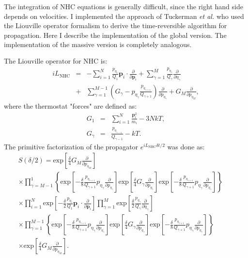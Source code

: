 \documentclass[12pt,a4paper]{article}
\begin{document}
The integration of NHC equations is generally difficult, since the right hand side depends on velocities.
I implemented the approach of Tuckerman \textit{et al.} who used the Liouville operator formalism to derive the time-reversible algorithm for propagation\cite{Martyna1996}. Here I describe the implementation of the global version. The implementation of the massive version is completely analogous.

The Liouville operator for NHC is:
\begin{eqnarray}
iL_{\textrm{NHC}}&=&-\sum^N_{i=1}\frac{p_{\eta_1}}{Q_1}\mathbf{p}_i\cdot \frac{\partial}{\partial \mathbf{p}_i}+
\sum_{\gamma =1}^M\frac{p_{\eta_\gamma}}{Q_\gamma}\frac{\partial}{\partial \eta_\gamma} \\
&+&\sum_{\gamma=1}^{M-1}\left( G_\gamma-p_{\eta_\gamma}\frac{p_{\eta_{\gamma+1}}}{Q_{\gamma+1}}\right)\frac{\partial}{\partial p_{\eta_\gamma}}+G_M\frac{\partial}{\partial p_{\eta_M}} ,\nonumber
\end{eqnarray}
where the thermostat "forces" are defined as:
\begin{eqnarray}
G_1&=&\sum^N_{i=1}\frac{\mathbf{p}_i^2}{m_i}-3NkT   ,\\
G_\gamma &=&\frac{p_{\eta_{\gamma-1}}}{Q_{\gamma-1}}-kT\nonumber  .
\end{eqnarray}
The primitive factorization of the propagator $e^{iL_{\mathrm{NHC}}\delta t/2} $ was done as:
\begin{eqnarray}
S(\delta/2)=\mathrm{exp}\left[\frac{\delta}{4} G_M \frac{\partial}{\partial p_{\eta_M}} \right] &&\nonumber \\
\times \prod^{1}_{\gamma =M-1} \left\lbrace \mathrm{exp}\left[-\frac{\delta}{8}  \frac{p_{\eta_{\gamma+1}}}{Q_{\gamma+1}}
p_{\eta_\gamma}\frac{\partial}{\partial p_{\eta_\gamma}} \right]
\mathrm{exp}\left[\frac{\delta}{4}G_\gamma\frac{\partial}{\partial p_{\eta_\gamma}} \right]
\mathrm{exp}\left[-\frac{\delta}{8}\frac{p_{\eta_{\gamma+1}}}{Q_{\gamma+1}}
p_{\eta_\gamma}\frac{\partial}{\partial p_{\eta_\gamma}} \right] \right\rbrace & & \nonumber\\
\times  \prod^N_{i=1} 
\mathrm{exp}\left[-\frac{\delta}{2}\frac{p_{\eta_1}}{Q_1}\mathbf{p}_i\cdot\frac{\partial}{\partial \mathbf{p}_i} \right]
\prod^M_{\gamma=1} \mathrm{exp}\left[\frac{\delta}{2}\frac{p_{\eta_\gamma}}{Q_\gamma}\frac{\partial}{\partial \eta_\gamma} \right]& &  \nonumber \\
\times  \prod^{M-1}_{\gamma =1} \left\lbrace \mathrm{exp}\left[-\frac{\delta}{8}\frac{p_{\eta_{\gamma+1}}}{Q_{\gamma+1}}
p_{\eta_\gamma}\frac{\partial}{\partial p_{\eta_\gamma}} \right] 
\mathrm{exp}\left[\frac{\delta}{4}G_\gamma\frac{\partial}{\partial p_{\eta_\gamma}} \right]
\mathrm{exp}\left[-\frac{\delta}{8}\frac{p_{\eta_{\gamma+1}}}{Q_{\gamma+1}}
p_{\eta_\gamma}\frac{\partial}{\partial p_{\eta_\gamma}} \right] \right\rbrace &  & \nonumber \\
\times  \mathrm{exp}\left[\frac{\delta}{4} G_M \frac{\partial}{\partial p_{\eta_M}} \right]  .& &
\label{eqprimfac}
\end{eqnarray}
\end{document}
